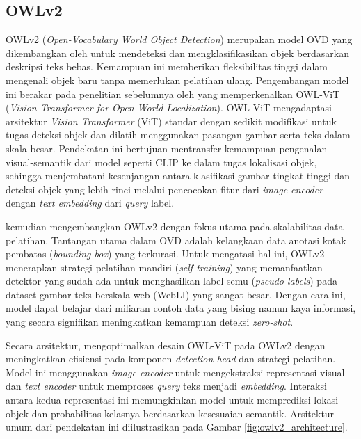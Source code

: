 \subsection{OWLv2}
OWLv2 (\textit{Open-Vocabulary World Object Detection}) merupakan model OVD yang dikembangkan oleh \textcite{mindererScalingOpenVocabularyObject2024} untuk mendeteksi dan mengklasifikasikan objek berdasarkan deskripsi teks bebas. Kemampuan ini memberikan fleksibilitas tinggi dalam mengenali objek baru tanpa memerlukan pelatihan ulang. Pengembangan model ini berakar pada penelitian sebelumnya oleh \textcite{mindererSimpleOpenVocabularyObject2022} yang memperkenalkan OWL-ViT (\textit{Vision Transformer for Open-World Localization}). OWL-ViT mengadaptasi arsitektur \textit{Vision Transformer} (ViT) standar dengan sedikit modifikasi untuk tugas deteksi objek dan dilatih menggunakan pasangan gambar serta teks dalam skala besar. Pendekatan ini bertujuan mentransfer kemampuan pengenalan visual-semantik dari model seperti CLIP ke dalam tugas lokalisasi objek, sehingga menjembatani kesenjangan antara klasifikasi gambar tingkat tinggi dan deteksi objek yang lebih rinci melalui pencocokan fitur dari \textit{image encoder} dengan \textit{text embedding} dari \textit{query} label.

\textcite{mindererScalingOpenVocabularyObject2024} kemudian mengembangkan OWLv2 dengan fokus utama pada skalabilitas data pelatihan. Tantangan utama dalam OVD adalah kelangkaan data anotasi kotak pembatas (\textit{bounding box}) yang terkurasi. Untuk mengatasi hal ini, OWLv2 menerapkan strategi pelatihan mandiri (\textit{self-training}) yang memanfaatkan detektor yang sudah ada untuk menghasilkan label semu (\textit{pseudo-labels}) pada dataset gambar-teks berskala web (WebLI) yang sangat besar. Dengan cara ini, model dapat belajar dari miliaran contoh data yang bising namun kaya informasi, yang secara signifikan meningkatkan kemampuan deteksi \textit{zero-shot}.

Secara arsitektur, \textcite{mindererScalingOpenVocabularyObject2024} mengoptimalkan desain OWL-ViT pada OWLv2 dengan meningkatkan efisiensi pada komponen \textit{detection head} dan strategi pelatihan. Model ini menggunakan \textit{image encoder} untuk mengekstraksi representasi visual dan \textit{text encoder} untuk memproses \textit{query} teks menjadi \textit{embedding}. Interaksi antara kedua representasi ini memungkinkan model untuk memprediksi lokasi objek dan probabilitas kelasnya berdasarkan kesesuaian semantik. Arsitektur umum dari pendekatan ini diilustrasikan pada Gambar \ref{fig:owlv2_architecture}.

